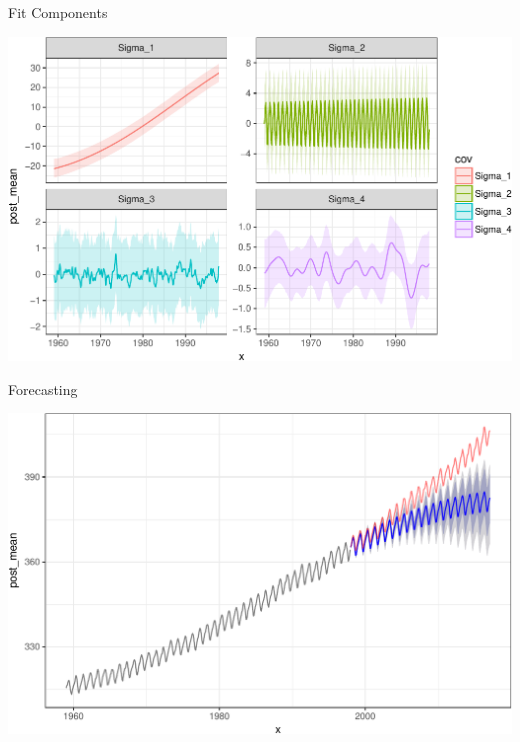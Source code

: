 \documentclass[11pt,ignorenonframetext,]{beamer}
\begin{document}
\begin{frame}{%
\protect\hypertarget{fit-components}{%
Fit Components}}

\begin{center}\includegraphics[width=\textwidth]{Lec14_files/figure-beamer/unnamed-chunk-19-1} \end{center}

\end{frame}

\begin{frame}{%
\protect\hypertarget{forecasting}{%
Forecasting}}

\begin{center}\includegraphics[width=\textwidth]{Lec14_files/figure-beamer/unnamed-chunk-22-1} \end{center}

\end{frame}
\end{document}
